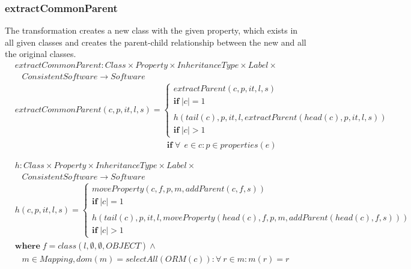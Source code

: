 \documentclass[10pt]{article}
\begin{document}
\subsubsection{extractCommonParent}
The transformation creates a new class with the given property, which exists in all given classes and creates the parent-child relationship between the new and all the original classes.
\begin{align}
& extractCommonParent: Class \times Property \times InheritanceType \times Label \times
\nonumber \\
& \;\;\; ConsistentSoftware \rightarrow Software \\
& extractCommonParent(c, p, it, l, s) = \begin{cases}
     extractParent(c, p, it, l, s) \\
     \mathbf{if} \; |c| = 1 \\\\
     h(tail(c), p, it, l, extractParent(head(c), p, it, l, s)) \\
       \mathbf{if} \; |c| > 1
 \end{cases} \\
& \;\;\;\;\;\;\;\;\;\;\;\;\;\;\;\;\;\;\;\;\;\;\;\;\;\;\;\;\;\;\;\;\;\;\;\;\;\;\;\;\;\;\;\;\;\;\;\;\;\;\;\;\;\;\;\;\;\;\;\;\;\;\;\;\; \mathbf{if} \; \forall \: \: e \in c : p \in properties(e)
\end{align}

\begin{align}
& h: Class \times Property \times InheritanceType \times Label \times
\nonumber \\
& \;\;\; ConsistentSoftware \rightarrow Software \\
& h(c, p, it, l, s) = \begin{cases}
    moveProperty(c, f, p, m, addParent(c, f, s)) \\
    \mathbf{if} \; |c| = 1 \\
   \\
    h(tail(c), p, it, l, moveProperty(head(c), f, p, m, addParent(head(c), f, s)))\\
    \mathbf{if} \; |c| > 1
 \end{cases} \nonumber \\
&   \mathbf{where} \; f = class(l, \emptyset, \emptyset, OBJECT) \land  \\
&    \;\;\; m \in Mapping, dom(m) = selectAll(ORM(c)) : \forall \: r \in m :  m(r) = r 
\end{align}
\end{document}
